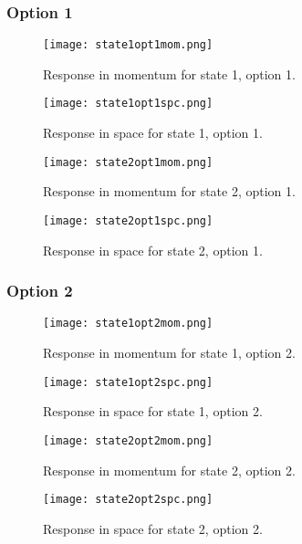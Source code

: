 \documentclass[12pt]{article}
\begin{document}
\subsubsection{Option 1}
\begin{figure}
\texttt{[image: state1opt1mom.png]}
\caption{\label{fig:state1opt1mom}Response in momentum for state 1, option 1.}
\end{figure}
\begin{figure}
\texttt{[image: state1opt1spc.png]}
\caption{\label{fig:state1opt1spc}Response in space for state 1, option 1.}
\end{figure}
\begin{figure}
\texttt{[image: state2opt1mom.png]}
\caption{\label{fig:state2opt1mom}Response in momentum for state 2, option 1.}
\end{figure}
\begin{figure}
\texttt{[image: state2opt1spc.png]}
\caption{\label{fig:state2opt1spc}Response in space for state 2, option 1.}
\end{figure}

\subsubsection{Option 2}
\begin{figure}
\texttt{[image: state1opt2mom.png]}
\caption{\label{fig:state1opt2mom}Response in momentum for state 1, option 2.}
\end{figure}
\begin{figure}
\texttt{[image: state1opt2spc.png]}
\caption{\label{fig:state1opt2spc}Response in space for state 1, option 2.}
\end{figure}
\begin{figure}
\texttt{[image: state2opt2mom.png]}
\caption{\label{fig:state2opt2mom}Response in momentum for state 2, option 2.}
\end{figure}
\begin{figure}
\texttt{[image: state2opt2spc.png]}
\caption{\label{fig:state2opt2spc}Response in space for state 2, option 2.}
\end{figure}
\end{document}
